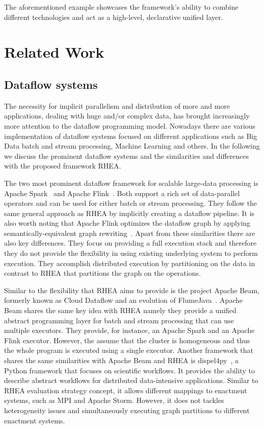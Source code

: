 \documentclass[sigplan,screen]{acmart}
\begin{document}
The aforementioned example showcases the framework's ability to combine different
technologies and act as a high-level, declarative unified layer.

\section{Related Work} \label{sec:related}

\subsection{Dataflow systems}

The necessity for implicit parallelism and distribution of more and more
applications, dealing with huge and/or complex data, has brought increasingly
more attention to the dataflow programming model. Nowadays there are various
implementation of dataflow systems focused on different applications such as
Big Data batch and stream processing, Machine Learning and others.
In the following we discuss the prominent dataflow systems and the similarities
and differences with the proposed framework \textsc{RHEA}.

The two most prominent dataflow framework for scalable large-data processing
is Apache Spark~\cite{spark} and Apache Flink~\cite{stratosphere}. Both support
a rich set of data-parallel operators and can be used for either batch or
stream processing. They follow the same general approach as \textsc{RHEA} by
implicitly creating a dataflow pipeline. It is also worth noting that Apache Flink
optimizes the dataflow graph by applying semantically-equivalent graph rewriting~\cite{blackbox}.
Apart from these similarities there are also key differences.
They focus on providing a full execution stack and therefore they do not
provide the flexibility in using
existing  underlying system to perform execution. They accomplish distributed
execution by partitioning on the data in contrast to \textsc{RHEA} that partitions
the graph on the operations.

Similar to the flexibility that \textsc{RHEA} aims to provide is the project
Apache Beam, formerly known as Cloud Dataflow and an evolution of FlumeJava~\cite{flumejava}.
Apache Beam shares the same key idea with \textsc{RHEA} namely they provide a
unified abstract programming layer for batch and stream processing that can use
multiple executors. They provide, for instance, an Apache Spark and an Apache Flink
executor. However, the assume that the cluster is homogeneous and thus the whole
program is executed using a single executor. Another framework that shares the
same similarities with Apache Beam and RHEA is dispel4py~\cite{dispel4py}, a Python
framework that focuses on scientific workflows. It provides the ability
to describe abstract workflows for distributed data-intensive applications.
Similar to \textsc{RHEA} evaluation strategy concept, it allows different mappings
to enactment systems, such as MPI and Apache Storm. However, it does not tackles
heterogeneity issues and simultaneously executing graph partitions to different
enactment systems.
\end{document}
